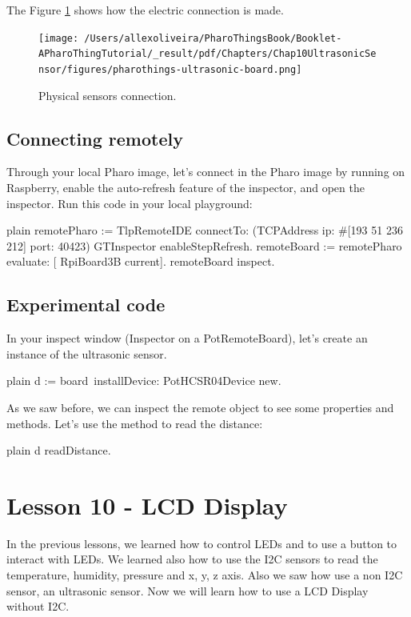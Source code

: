 \documentclass[10pt,twoside,english]{_support/latex/sbabook/sbabook}
\begin{document}
The Figure \ref{physicalSonicSensors} shows how the electric connection is made.


\begin{figure}

\begin{center}
\texttt{[image: /Users/allexoliveira/PharoThingsBook/Booklet-APharoThingTutorial/\_result/pdf/Chapters/Chap10UltrasonicSensor/figures/pharothings-ultrasonic-board.png]}\caption{Physical sensors connection.\label{physicalSonicSensors}}\end{center}
\end{figure}

\section{Connecting remotely}
Through your local Pharo image, let’s connect in the Pharo image by running on Raspberry, enable the auto-refresh feature of the inspector, and open the inspector.
Run this code in your local playground:

\begin{displaycode}{plain}
remotePharo := TlpRemoteIDE connectTo: (TCPAddress ip: #[193 51 236 212] port: 40423)
GTInspector enableStepRefresh.
remoteBoard := remotePharo evaluate: [ RpiBoard3B current].
remoteBoard inspect.
\end{displaycode}
\section{Experimental code}
In your inspect window (Inspector on a PotRemoteBoard), let’s create an instance of the ultrasonic sensor. 

\begin{displaycode}{plain}
d := board installDevice: PotHCSR04Device new. ​ 
\end{displaycode}

As we saw before, we can inspect the remote object to see some properties and methods. Let's use the method  to read the distance: 

\begin{displaycode}{plain}
d readDistance.  
\end{displaycode}
\chapter{Lesson 10 - LCD Display}
In the previous lessons, we learned how to control LEDs and to use a button to interact with LEDs. We learned also how to use the I2C sensors to read the temperature, humidity, pressure and x, y, z axis. Also we saw how use a non I2C sensor, an ultrasonic sensor. Now we will learn how to use a LCD Display without I2C. 
\end{document}
